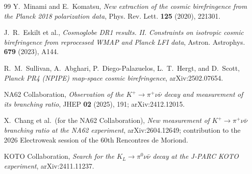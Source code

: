 \documentclass[11pt,a4paper]{article}
\theoremstyle{definition}
\theoremstyle{remark}
\begin{document}
\begin{thebibliography}{99}
Y.~Minami and E.~Komatsu,
\newblock \emph{New extraction of the cosmic birefringence from the Planck 2018 polarization data},
\newblock Phys. Rev. Lett. \textbf{125} (2020), 221301.

J.~R.~Eskilt et al.,
\newblock \emph{Cosmoglobe DR1 results. II. Constraints on isotropic cosmic birefringence from reprocessed WMAP and Planck LFI data},
\newblock Astron. Astrophys. \textbf{679} (2023), A144.

R.~M.~Sullivan, A.~Abghari, P.~Diego-Palazuelos, L.~T.~Hergt, and D.~Scott,
\newblock \emph{Planck PR4 (NPIPE) map-space cosmic birefringence},
\newblock arXiv:2502.07654.

NA62 Collaboration,
\newblock \emph{Observation of the $K^{+}\to\pi^{+}\nu\bar{\nu}$ decay and measurement of its branching ratio},
\newblock JHEP \textbf{02} (2025), 191; arXiv:2412.12015.

X.~Chang et al.\ (for the NA62 Collaboration),
\newblock \emph{New measurement of $K^{+}\to\pi^{+}\nu\bar{\nu}$ branching ratio at the NA62 experiment},
\newblock arXiv:2604.12649; contribution to the 2026 Electroweak session of the 60th Rencontres de Moriond.

KOTO Collaboration,
\newblock \emph{Search for the $K_{L}\to\pi^{0}\nu\bar{\nu}$ decay at the J-PARC KOTO experiment},
\newblock arXiv:2411.11237.

\end{thebibliography}
\end{document}
